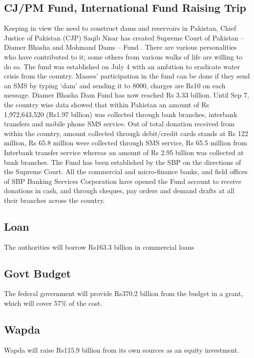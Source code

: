 \documentclass[11pt, journal,letterpaper,compsoc]{IEEEtran}
\begin{document}
\subsection{CJ/PM Fund, International Fund Raising Trip}
Keeping in view the need to construct dams and reservoirs in Pakistan, Chief Justice of Pakistan (CJP) Saqib Nisar has created  Supreme Court of Pakistan – Diamer Bhasha and Mohmand Dams – Fund . There are various personalities who have contributed to it; some others from various walks of life are willing to do so. The fund was established on July 4 with an ambition to eradicate water crisis from the country. Masses’ participation in the fund can be done if they send an SMS by typing ‘dam’ and sending it to 8000, charges are Rs10 on each message. Diamer Bhasha Dam Fund has now reached Rs 3.33 billion. Until Sep 7, the country wise data showed that within Pakistan an amount of Rs 1,972,643,520 (Rs1.97 billion) was collected through bank branches, interbank transfers and mobile phone SMS service. Out of total donation received from within the country, amount collected through debit/credit cards stands at Rs 122 million, Rs 65.8 million were collected through SMS service, Rs 65.5 million from Interbank transfer service whereas an amount of Rs 2.95 billion was collected at bank branches. The Fund has been established by the SBP on the directions of the Supreme Court. All the commercial and micro-finance banks, and field offices of SBP Banking Services Corporation have opened the Fund account to receive donations in cash, and through cheques, pay orders and demand drafts at all their branches across the country.

\subsection{Loan}
The authorities will borrow Rs163.3 billion in commercial loans

\subsection{Govt Budget}
The federal government will provide Rs370.2 billion from the budget in a grant, which will cover 57\% of the cost. 

\subsection{Wapda}
Wapda will raise Rs115.9 billion from its own sources as an equity investment.
\end{document}
